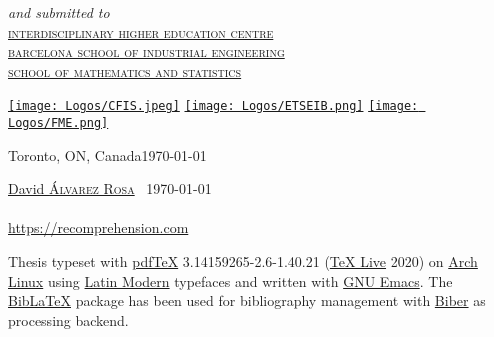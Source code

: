 \begin{titlepage}
  \large
  \textsl{and submitted to}\Large\\[-.25ex]
  \scshape
  \href{https://cfis.upc.edu/en}{interdisciplinary higher education centre}\\[-.5ex]
  \href{https://etseib.upc.edu/en}{barcelona school of industrial engineering}\\[-.5ex]
  \href{https://fme.upc.edu/en}{school of mathematics and statistics}


  \vfill
  \href{https://cfis.upc.edu/en}{\texttt{[image: Logos/CFIS.jpeg]}}
  \hspace{1em}
  \href{https://etseib.upc.edu/en}{\texttt{[image: Logos/ETSEIB.png]}}
  \hspace{1em}
  \href{https://fme.upc.edu/en}{\texttt{[image: Logos/FME.png]}}\\[1ex]

  \vfill

  \normalsize
  Toronto, ON, Canada\hfill\today
\end{titlepage}




\thispagestyle{empty}
\small
\null\vfill

\begin{center}
\end{center}

\vspace{1ex}
\noindent\href{https://david.alvarezrosa.com/}{David \textsc{Álvarez Rosa}}
\textcopyright\ \today\\
\makeatletter\href{https://recomprehension.com/}{\textsl{\@title}}\makeatother\\
\url{https://recomprehension.com}


\bigskip
\noindent Thesis typeset with
\href{http://tug.org/applications/pdftex/}{pdf\TeX{}} 3.14159265-2.6-1.40.21
(\href{https://www.tug.org/svn/texlive/}{\TeX{} Live} 2020) on
\href{https://archlinux.org/}{Arch Linux} using
\href{https://www.ctan.org/tex-archive/fonts/lm/}{Latin Modern} typefaces and
written with \href{https://www.gnu.org/software/emacs/}{GNU Emacs}. The
\href{https://www.ctan.org/pkg/biblatex}{Bib\LaTeX{}} package has been used for
bibliography management with
\href{http://biblatex-biber.sourceforge.net/}{Biber} as processing backend.

